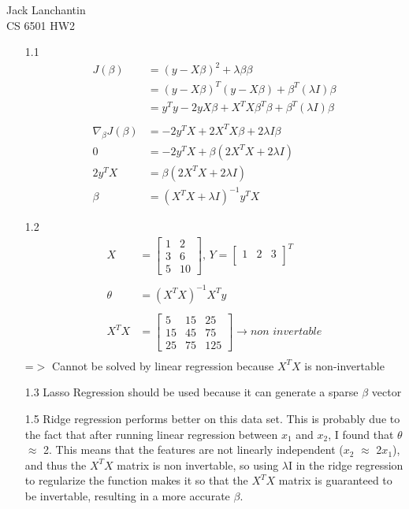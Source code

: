 \documentclass{article}
\begin{document}
\noindent Jack Lanchantin\\
CS 6501 HW2

\begin{enumerate}

\item[1.1]
\begin{align*}
	J(\beta) & = (y-X\beta)^2 + \lambda\beta\beta \\
	& = (y-X\beta)^T(y-X\beta) + \beta^T(\lambda I)\beta \\
	& = y^Ty - 2yX\beta + X^TX\beta^T\beta + \beta^T(\lambda I)\beta \\
			\\
	\nabla_\beta J(\beta) & = -2y^TX + 2X^TX\beta + 2\lambda I \beta \\
	0 & = -2y^TX + \beta(2X^TX + 2\lambda I) \\
	2y^TX & = \beta(2X^TX + 2\lambda I) \\
	\beta & = (X^TX + \lambda I)^{-1} y^TX 
\end{align*}

\item[1.2]
\begin{align*}
	X & =
	\begin{bmatrix}
	  1 & 2 \\
	  3 & 6 \\
	  5 & 10
	\end{bmatrix}, 
	\,Y = 
	\begin{bmatrix}
	  1 & 2 & 3 \\
	\end{bmatrix}^T \\
	\\
	\theta & = (X^TX)^{-1}X^Ty \\ \\
	X^TX & = 
	\begin{bmatrix}
	  5 & 15 & 25 \\
	  15 & 45 & 75\\
	  25 & 75 & 125
	\end{bmatrix} \longrightarrow non\,\,invertable \\
\end{align*}
=$>$ Cannot be solved by linear regression because $X^TX$ is non-invertable\\

\item[1.3]
Lasso Regression should be used because it can generate a sparse $\beta$ vector\\

\item[1.5]
Ridge regression performs better on this data set. This is probably due to the fact that after running linear regression between $x_1$ and $x_2$, I found that $\theta$ $\approx$ 2. This means that the features are not linearly independent ($x_2$ $\approx$ 2$x_1$), and thus the $X^TX$ matrix is non invertable, so using $\lambda$I in the ridge regression to regularize the function makes it so that the $X^TX$ matrix is guaranteed to be invertable, resulting in a more accurate $\beta$.

\end{enumerate}
\end{document}

